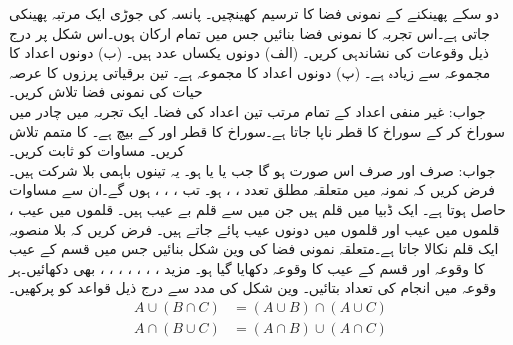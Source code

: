 \quad
دو سکے پھینکنے کے نمونی فضا کا ترسیم کھینچیں۔
\quad
پانسہ کی جوڑی ایک مرتبہ پھینکی جاتی ہے۔اس تجربہ کا نمونی فضا بنائیں جس میں تمام ارکان ہوں۔اس شکل پر درج ذیل وقوعات کی نشاندہی کریں۔
(الف) دونوں یکساں عدد ہیں۔ (ب) دونوں اعداد کا مجموعہ  سے زیادہ ہے۔ (پ) دونوں اعداد کا مجموعہ  ہے۔
\quad
تین برقیاتی پرزوں کا عرصہ حیات کی  نمونی فضا تلاش کریں۔\\
جواب:\quad
غیر منفی اعداد کے تمام مرتب تین اعداد کی  فضا۔ 
\quad
ایک تجربہ میں چادر میں سوراخ کر کے سوراخ کا قطر ناپا جاتا ہے۔سوراخ  کا قطر  اور  کے بیچ ہے۔ کا متمم تلاش کریں۔
\quad
مساوات  کو ثابت کریں۔\\
جواب:\quad
{} صرف اور صرف اس صورت ہو گا جب  یا  یا   ہو۔ یہ تینوں باہمی بلا شرکت ہیں۔فرض کریں کہ نمونہ میں متعلقہ مطلق تعدد ، ،  ہو۔ تب ، ، ،  ہوں گے۔ان سے مساوات  حاصل ہوتا ہے۔
\quad
ایک ڈبیا میں  قلم ہیں جن میں سے  قلم بے عیب ہیں۔ قلموں میں عیب ،  قلموں میں عیب  اور  قلموں میں دونوں عیب پائے جاتے ہیں۔ فرض کریں کہ بلا منصوبہ ایک قلم نکالا جاتا ہے۔متعلقہ نمونی فضا  کی وین شکل بنائیں جس میں  قسم کے عیب کا وقوعہ  اور   قسم کے عیب کا وقوعہ  دکھایا گیا ہو۔ مزید ، ، ، ، ، ، ،  بھی دکھائیں۔ہر وقوعہ میں انجام کی تعداد بتائیں۔
\quad
وین شکل کی مدد سے درج ذیل قواعد کو پرکھیں۔
\begin{align*}
A\cup (B\cap C)&=(A\cup B) \cap (A\cup C)\\
A\cap (B\cup C)&=(A\cap B)\cup (A\cap C)
\end{align*}
\quad {} \quad 
